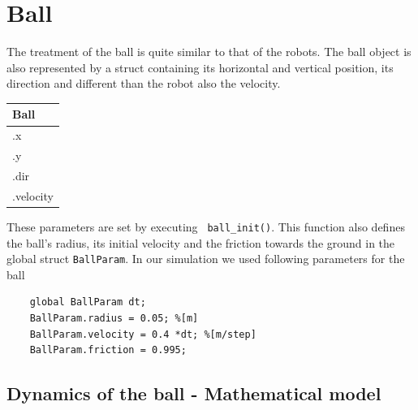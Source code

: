 \section{Ball} \label{Ballsection}

The treatment of the ball is quite similar to that of the robots. The ball object is also represented by a struct containing its horizontal and vertical position, its direction and different than the robot also the velocity.
\begin{center}
	\begin{tabular}{| l |} \hline
		Ball \\ \hline
		.x \\
		.y \\
		.dir \\
		.velocity \\ \hline
	\end{tabular}
\end{center}
 These parameters are set by executing \texttt{ ball\_init()}. This function also defines the ball's radius, its initial velocity and the friction towards the ground in the global struct \texttt{BallParam}. In our simulation we used following parameters for the ball
\begin{lstlisting}
    global BallParam dt;
    BallParam.radius = 0.05; %[m]
    BallParam.velocity = 0.4 *dt; %[m/step]
    BallParam.friction = 0.995;
\end{lstlisting}
 
\subsection*{Dynamics of the ball - Mathematical model}

